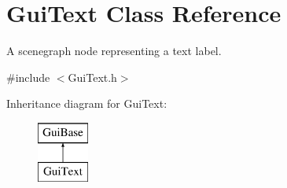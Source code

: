 \hypertarget{class_gui_text}{\section{Gui\-Text Class Reference}
\label{class_gui_text}
}


A scenegraph node representing a text label.  




{\ttfamily \#include $<$Gui\-Text.\-h$>$}

Inheritance diagram for Gui\-Text\-:\begin{figure}[H]
\begin{center}
\leavevmode
\includegraphics[height=2.000000cm]{class_gui_text}
\end{center}
\end{figure}
